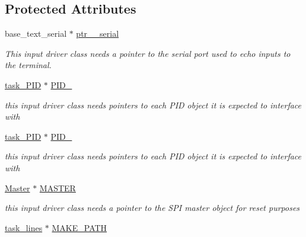 \subsection*{Protected Attributes}
\begin{DoxyCompactItemize}
\item 
\hypertarget{classtask__read_a2c44e2c5f153938a1db87c277ae6476c}{base\-\_\-text\-\_\-serial $\ast$ \hyperlink{classtask__read_a2c44e2c5f153938a1db87c277ae6476c}{ptr\-\_\-\_\-serial}}\label{classtask__read_a2c44e2c5f153938a1db87c277ae6476c}

\begin{DoxyCompactList}\small\item\em This input driver class needs a pointer to the serial port used to echo inputs to the terminal. \end{DoxyCompactList}\item 
\hypertarget{classtask__read_a7ca1336ab22aaffc1a5d2c8d7d426d25}{\hyperlink{classtask___p_i_d}{task\-\_\-\-P\-I\-D} $\ast$ \hyperlink{classtask__read_a7ca1336ab22aaffc1a5d2c8d7d426d25}{P\-I\-D\-\_}}\label{classtask__read_a7ca1336ab22aaffc1a5d2c8d7d426d25}

\begin{DoxyCompactList}\small\item\em this input driver class needs pointers to each P\-I\-D object it is expected to interface with \end{DoxyCompactList}\item 
\hypertarget{classtask__read_a5b9f8ebc163883379819589d378f3ad6}{\hyperlink{classtask___p_i_d}{task\-\_\-\-P\-I\-D} $\ast$ \hyperlink{classtask__read_a5b9f8ebc163883379819589d378f3ad6}{P\-I\-D\-\_}}\label{classtask__read_a5b9f8ebc163883379819589d378f3ad6}

\begin{DoxyCompactList}\small\item\em this input driver class needs pointers to each P\-I\-D object it is expected to interface with \end{DoxyCompactList}\item 
\hypertarget{classtask__read_abb8403f54a536520302a191b105c1aa3}{\hyperlink{class_master}{Master} $\ast$ \hyperlink{classtask__read_abb8403f54a536520302a191b105c1aa3}{M\-A\-S\-T\-E\-R}}\label{classtask__read_abb8403f54a536520302a191b105c1aa3}

\begin{DoxyCompactList}\small\item\em this input driver class needs a pointer to the S\-P\-I master object for reset purposes \end{DoxyCompactList}\item 
\hypertarget{classtask__read_a081e0558ca0461e26aa722a86708ab85}{\hyperlink{classtask__lines}{task\-\_\-lines} $\ast$ \hyperlink{classtask__read_a081e0558ca0461e26aa722a86708ab85}{M\-A\-K\-E\-\_\-\-P\-A\-T\-H}}\label{classtask__read_a081e0558ca0461e26aa722a86708ab85}


\end{DoxyCompactItemize}
